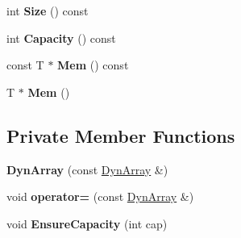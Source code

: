 \begin{DoxyCompactItemize}
\item 
\hypertarget{classtinyxml2_1_1_dyn_array_a5c3874dd4d5d0bf32919161b19ac7287}{}int {\bfseries Size} () const \label{classtinyxml2_1_1_dyn_array_a5c3874dd4d5d0bf32919161b19ac7287}

\item 
\hypertarget{classtinyxml2_1_1_dyn_array_a5ab6ef31e984e5cf78d0eb70ad3aec6d}{}int {\bfseries Capacity} () const \label{classtinyxml2_1_1_dyn_array_a5ab6ef31e984e5cf78d0eb70ad3aec6d}

\item 
\hypertarget{classtinyxml2_1_1_dyn_array_aef95a07fb624948d8ce3e638ab2e1f8b}{}const T $\ast$ {\bfseries Mem} () const \label{classtinyxml2_1_1_dyn_array_aef95a07fb624948d8ce3e638ab2e1f8b}

\item 
\hypertarget{classtinyxml2_1_1_dyn_array_a2f0842cd666e2ad951f1a8bd6561fa40}{}T $\ast$ {\bfseries Mem} ()\label{classtinyxml2_1_1_dyn_array_a2f0842cd666e2ad951f1a8bd6561fa40}

\end{DoxyCompactItemize}
\subsection*{Private Member Functions}
\begin{DoxyCompactItemize}
\item 
\hypertarget{classtinyxml2_1_1_dyn_array_a8e2251588f079f2e7a4080b2c53dabea}{}{\bfseries Dyn\+Array} (const \hyperlink{classtinyxml2_1_1_dyn_array}{Dyn\+Array} \&)\label{classtinyxml2_1_1_dyn_array_a8e2251588f079f2e7a4080b2c53dabea}

\item 
\hypertarget{classtinyxml2_1_1_dyn_array_a46fa3bff1a6abe7cafad46707d0bb890}{}void {\bfseries operator=} (const \hyperlink{classtinyxml2_1_1_dyn_array}{Dyn\+Array} \&)\label{classtinyxml2_1_1_dyn_array_a46fa3bff1a6abe7cafad46707d0bb890}

\item 
\hypertarget{classtinyxml2_1_1_dyn_array_a30f2dec82744b45667452e6ce3d51e32}{}void {\bfseries Ensure\+Capacity} (int cap)\label{classtinyxml2_1_1_dyn_array_a30f2dec82744b45667452e6ce3d51e32}

\end{DoxyCompactItemize}
